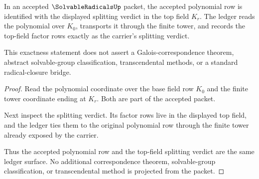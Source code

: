 \begin{theorem}
\label{thm:solvableradicals-splitting-ledger-exactness}
In an accepted $\SolvableRadicalsUp$ packet, the accepted polynomial row is
identified with the displayed splitting verdict in the top field $K_r$. The
ledger reads the polynomial over $K_0$, transports it through the finite tower,
and records the top-field factor rows exactly as the carrier's splitting
verdict.

This exactness statement does not assert a Galois-correspondence theorem,
abstract solvable-group classification, transcendental methods, or a standard
radical-closure bridge.
\end{theorem}
\begin{proof}
Read the polynomial coordinate over the base field row $K_0$ and the finite
tower coordinate ending at $K_r$. Both are part of the accepted packet.

Next inspect the splitting verdict. Its factor rows live in the displayed top
field, and the ledger ties them to the original polynomial row through the
finite tower already exposed by the carrier.

Thus the accepted polynomial row and the top-field splitting verdict are the
same ledger surface. No additional correspondence theorem, solvable-group
classification, or transcendental method is projected from the packet.
\end{proof}

